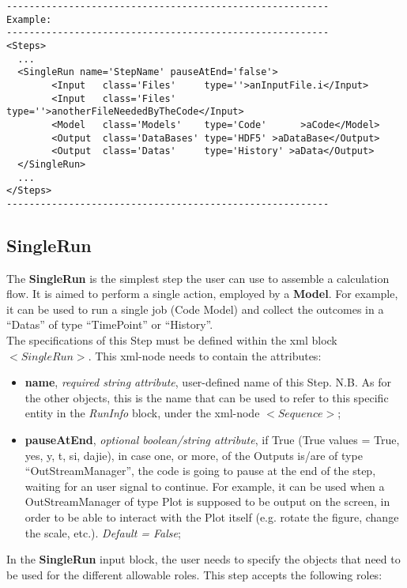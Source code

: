 \begin{lstlisting}[style=XML]
---------------------------------------------------------
Example:
---------------------------------------------------------
<Steps>
  ...
  <SingleRun name='StepName' pauseAtEnd='false'> 
        <Input   class='Files'     type=''>anInputFile.i</Input>
        <Input   class='Files'     type=''>anotherFileNeededByTheCode</Input>
        <Model   class='Models'    type='Code'      >aCode</Model>
        <Output  class='DataBases' type='HDF5' >aDataBase</Output>
        <Output  class='Datas'     type='History' >aData</Output>
  </SingleRun>
  ...
</Steps>
---------------------------------------------------------
\end{lstlisting}
\subsection{SingleRun}
\label{subsec:stepSingleRun}
The  \textbf{SingleRun} is the simplest step the user can use to assemble a calculation flow. It is aimed to perform a single  action, employed by a \textbf{Model}. For example, it can be used to run a single job (Code Model) and collect the outcomes in a ``Datas'' of type ``TimePoint'' or ``History''.
\\ The specifications of this Step must be defined within the xml block $<SingleRun>$. This xml-node needs to contain the attributes:
\vspace{-5mm}
\begin{itemize}
\itemsep0em
\item \textbf{name}, \textit{required string attribute}, user-defined name of this Step. N.B. As for the other objects, this is the name that can be used to refer to this specific entity in the \textit{RunInfo} block, under the xml-node $<Sequence>$;
\item \textbf{pauseAtEnd}, \textit{optional boolean/string attribute}, if True (True values = True, yes, y, t, si, dajie), in case one, or more, of the Outputs is/are of type ``OutStreamManager'', the code is going to pause at the end of the step, waiting for an user signal to continue. For example, it can be used when a OutStreamManager of type Plot is supposed to be output on the screen, in order to be able to interact with the Plot itself (e.g. rotate the figure, change the scale, etc.).  \textit{Default = False};
\end{itemize}
\vspace{-5mm}
In the \textbf{SingleRun} input block, the user needs to specify the objects that need to be used for the different allowable roles. This step accepts the following roles:
